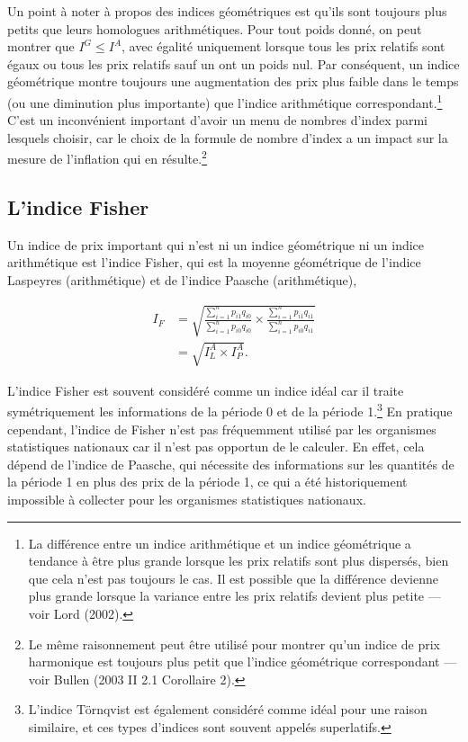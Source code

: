 \documentclass[]{article}
\begin{document}
Un point à noter à propos des indices géométriques est qu'ils sont toujours plus petits que leurs homologues arithmétiques. Pour tout poids donné, on peut montrer que \(I^{G} \leq I^{A}\), avec égalité uniquement lorsque tous les prix relatifs sont égaux ou tous les prix relatifs sauf un ont un poids nul. Par conséquent, un indice géométrique montre toujours une augmentation des prix plus faible dans le temps (ou une diminution plus importante) que l'indice arithmétique correspondant.\footnote{La différence entre un indice arithmétique et un indice géométrique a tendance à être plus grande lorsque les prix relatifs sont plus dispersés, bien que cela n'est pas toujours le cas. Il est possible que la différence devienne plus grande lorsque la variance entre les prix relatifs devient plus petite --- voir Lord (2002).} C'est un inconvénient important d'avoir un menu de nombres d'index parmi lesquels choisir, car le choix de la formule de nombre d'index a un impact sur la mesure de l'inflation qui en résulte.\footnote{Le même raisonnement peut être utilisé pour montrer qu'un indice de prix harmonique est toujours plus petit que l'indice géométrique correspondant --- voir Bullen (2003 II 2.1 Corollaire 2).}

\hypertarget{lindice-fisher}{%
\subsection{L'indice Fisher}\label{lindice-fisher}}

Un indice de prix important qui n'est ni un indice géométrique ni un indice arithmétique est l'indice Fisher, qui est la moyenne géométrique de l'indice Laspeyres (arithmétique) et de l'indice Paasche (arithmétique),

\begin{align*}
I_{F} &= \sqrt{\frac{\sum_{i = 1}^{n} p_{i1} q_{i0}}{\sum_{i = 1}^{n} p_{i0} q_{i0}} \times \frac{\sum_{i = 1}^{n} p_{i1} q_{i1}}{\sum_{i = 1}^{n} p_{i0} q_{i1}}} \\
&= \sqrt{I^{A}_{L} \times I^{A}_{P}}.
\end{align*}

L'indice Fisher est souvent considéré comme un indice idéal car il traite symétriquement les informations de la période 0 et de la période 1.\footnote{L'indice Törnqvist est également considéré comme idéal pour une raison similaire, et ces types d'indices sont souvent appelés superlatifs.} En pratique cependant, l'indice de Fisher n'est pas fréquemment utilisé par les organismes statistiques nationaux car il n'est pas opportun de le calculer. En effet, cela dépend de l'indice de Paasche, qui nécessite des informations sur les quantités de la période 1 en plus des prix de la période 1, ce qui a été historiquement impossible à collecter pour les organismes statistiques nationaux.
\end{document}
